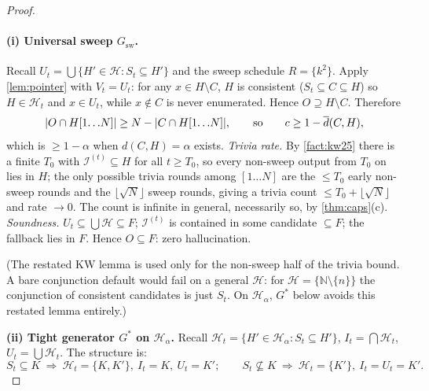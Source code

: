 \documentclass[11pt]{article}
\numberwithin{equation}{section}
\newcommand{\N}{\mathbb{N}}
\newcommand{\mc}[1]{\mathcal{#1}}
\DeclarePairedDelimiter{\abs}{\lvert}{\rvert}
\newcommand{\Amb}{F}
\newcommand{\Val}{H}
\newcommand{\Hcal}{\mc{H}}
\newcommand{\Hfam}{\Hcal_{\alpha}}
\newcommand{\Seen}{S}
\newcommand{\Out}{O}
\newcommand{\Core}{C}
\newcommand{\dup}[2]{\overline{d}(#1,#2)}
\newcommand{\dens}[2]{d(#1,#2)}
\newcommand{\cov}{c}
\newcommand{\rest}[2]{#1[1\!\dots\! #2]}
\theoremstyle{plain}
\theoremstyle{definition}
\theoremstyle{remark}
\begin{document}
\begin{proof}
\paragraph{(i) Universal sweep $G_{\mathrm{sw}}$.}
Recall $U_t = \bigcup\{H' \in \Hcal : \Seen_t \subseteq H'\}$ and the sweep schedule $R =
\{k^2\}$. Apply \cref{lem:pointer} with $V_t = U_t$: for any $x \in \Val \setminus
\Core$, $\Val$ is consistent ($\Seen_t \subseteq \Core \subseteq \Val$) so $\Val \in
\Hcal_t$ and $x \in U_t$, while $x \notin \Core$ is never enumerated. Hence $\Out \supseteq
\Val \setminus \Core$. Therefore
\begin{equation*}
  \abs{\Out \cap \rest{\Val}{N}} \ge N - \abs{\Core \cap \rest{\Val}{N}},
  \qquad\text{so}\qquad
  \cov \ge 1 - \dup{\Core}{\Val},
\end{equation*}
which is $\ge 1 - \alpha$ when $\dens{\Core}{\Val} = \alpha$ exists. \emph{Trivia rate.} By
\cref{fact:kw25} there is a finite $T_0$ with $\mathcal I^{(t)} \subseteq \Val$ for all $t \ge
T_0$, so every non-sweep output from $T_0$ on lies in $\Val$; the only possible trivia rounds
among $[1\dots N]$ are the $\le T_0$ early non-sweep rounds and the $\lfloor \sqrt N \rfloor$
sweep rounds, giving a trivia count $\le T_0 + \lfloor \sqrt N \rfloor$ and rate $\to 0$. The
count is infinite in general, necessarily so, by \cref{thm:caps}(c). \emph{Soundness.} $U_t
\subseteq \bigcup \Hcal \subseteq \Amb$; $\mathcal I^{(t)}$ is contained in some candidate
$\subseteq \Amb$; the fallback lies in $\Amb$. Hence $\Out \subseteq \Amb$: zero
hallucination.

(The restated KW lemma is used only for the non-sweep half of the trivia bound. A bare
conjunction default would fail on a general $\Hcal$: for $\Hcal = \{\N \setminus \{n\}\}$ the
conjunction of consistent candidates is just $\Seen_t$. On $\Hfam$, $G^*$ below avoids this
restated lemma entirely.)

\medskip\noindent\textbf{(ii) Tight generator $G^*$ on $\Hfam$.}\quad
Recall $\Hcal_t = \{H' \in \Hfam : \Seen_t \subseteq H'\}$, $I_t = \bigcap \Hcal_t$, $U_t =
\bigcup \Hcal_t$. The structure is:
\begin{equation*}
  \Seen_t \subseteq K \ \Longrightarrow\ \Hcal_t = \{K, K'\},\ I_t = K,\ U_t = K';
  \qquad
  \Seen_t \not\subseteq K \ \Longrightarrow\ \Hcal_t = \{K'\},\ I_t = U_t = K'.
\end{equation*}


\end{proof}
\end{document}
